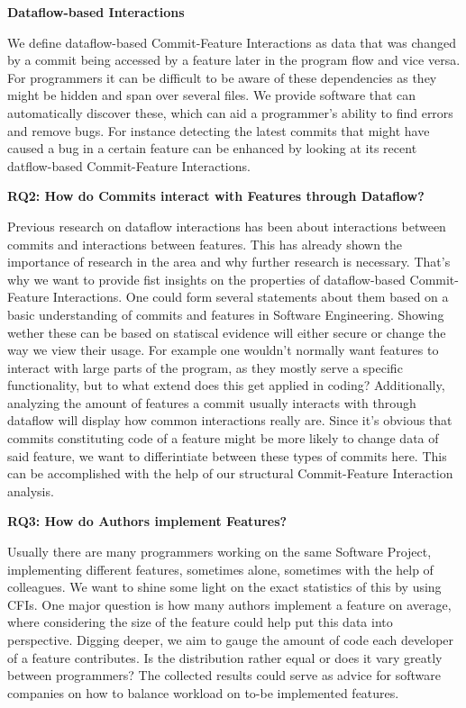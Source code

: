 \textbf{Dataflow-based Interactions} 

We define dataflow-based Commit-Feature Interactions as data that was changed by a commit being accessed by a feature later in the program flow and vice versa.
For programmers it can be difficult to be aware of these dependencies as they might be hidden and span over several files.
We provide software that can automatically discover these, which can aid a programmer's ability to find errors and remove bugs.
For instance detecting the latest commits that might have caused a bug in a certain feature can be enhanced by looking at its recent datflow-based Commit-Feature Interactions.

\textbf{RQ2: How do Commits interact with Features through Dataflow?}

Previous research on dataflow interactions has been about interactions between commits and interactions between features.
This has already shown the importance of research in the area and why further research is necessary.
That's why we want to provide fist insights on the properties of dataflow-based Commit-Feature Interactions.
One could form several statements about them based on a basic understanding of commits and features in Software Engineering.
Showing wether these can be based on statiscal evidence will either secure or change the way we view their usage.
For example one wouldn't normally want features to interact with large parts of the program, as they mostly serve a specific functionality, but to what extend does this get applied in coding?
Additionally, analyzing the amount of features a commit usually interacts with through dataflow will display how common interactions really are.
Since it's obvious that commits constituting code of a feature might be more likely to change data of said feature, we want to differintiate between these types of commits here.
This can be accomplished with the help of our structural Commit-Feature Interaction analysis. 

\textbf{RQ3: How do Authors implement Features?}

Usually there are many programmers working on the same Software Project, implementing different features, sometimes alone, sometimes with the help of colleagues.
We want to shine some light on the exact statistics of this by using CFIs.
One major question is how many authors implement a feature on average, where considering the size of the feature could help put this data into perspective.
Digging deeper, we aim to gauge the amount of code each developer of a feature contributes. Is the distribution rather equal or does it vary greatly between programmers?
The collected results could serve as advice for software companies on how to balance workload on to-be implemented features. 


